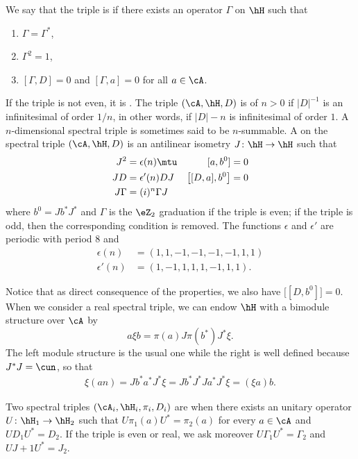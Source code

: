 We say that the triple is  if there exists an operator $\Gamma$ on $\hH$ such that
\begin{enumerate}
	\item $\Gamma=\Gamma^*$,
	\item $\Gamma^2=1$,
	\item $[\Gamma,D]=0$ and $[\Gamma,a]=0$ for all $a\in\cA$.
\end{enumerate}
If the triple is not even, it is . The triple $(\cA,\hH,D)$ is of  $n>0$ if $| D |^{-1}$ is an infinitesimal of order $1/n$, in other words, if $| D |-n$ is infinitesimal of order $1$. A $n$-dimensional spectral triple is sometimes said to be $n$-summable. A  on the spectral triple $(\cA,\hH,D)$ is an antilinear isometry $J\colon \hH\to \hH$ such that
\begin{align*}
	J^2     & =\epsilon(n)\mtu & [a,b^0]               & =0 \\
	JD      & =\epsilon'(n)DJ  & \big[ [D,a],b^0 \big] & =0 \\
	J\Gamma & =(i)^n\Gamma J
\end{align*}
where $b^0=Jb^*J^*$ and $\Gamma$ is the $\eZ_2$ graduation if the triple is even; if the triple is odd, then the corresponding condition is removed. The functions $\epsilon$ and $\epsilon'$ are periodic with period $8$ and
\[
	\begin{split}
		\epsilon(n)	&=(1,1,-1,-1,-1,-1,1,1)\\
		\epsilon'(n)	&=(1,-1,1,1,1,-1,1,1).
	\end{split}
\]

Notice that as direct consequence of the properties, we also have $\big[ [D,b^0] \big]=0$. When we consider a real spectral triple, we can endow $\hH$ with a bimodule structure over $\cA$ by
\[
	a\xi b=\pi(a)J\pi(b^*)J^*\xi.
\]
The left module structure is the usual one while the right is well defined because $J^*J=\cun$, so that
\begin{align*}
	\xi(an)=Jb^*a^*J^*\xi=Jb^*J^*Ja^*J^*\xi=(\xi a)b.
\end{align*}

Two spectral triples $(\cA_i,\hH_i,\pi_i,D_i)$ are  when there exists an unitary operator $U\colon \hH_1\to \hH_2$ such that $U\pi_1(a)U^*=\pi_2(a)$ for every $a\in\cA$ and $UD_1U^*=D_2$. If the triple is even or real, we ask moreover $U\Gamma_1U^*=\Gamma_2$ and $UJ+1U^*=J_2$.

